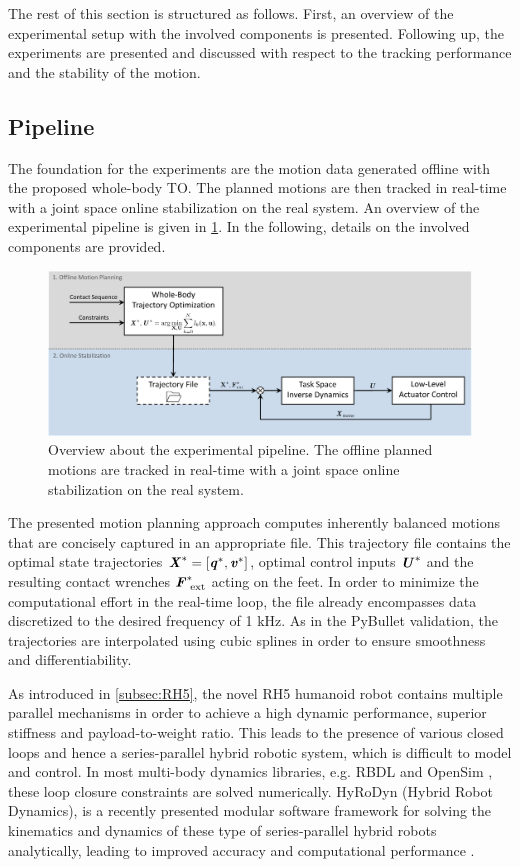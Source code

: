 The rest of this section is structured as follows. First, an overview of the experimental setup with the involved components is presented. Following up, the experiments are presented and discussed with respect to the tracking performance and the stability of the motion.

\subsection{Pipeline}\label{subsec:Pipeline}
The foundation for the experiments are the motion data generated offline with the proposed whole-body \gls{TO}. The planned motions are then tracked in real-time with a joint space online stabilization on the real system. An overview of the experimental pipeline is given in \cref{img:experimentalSetup}. In the following, details on the involved components are provided. 
\begin{figure}
\centering	
\includegraphics[width=1\textwidth]{img/experimentalSetup}
\caption[Overview about the experimental pipeline]{Overview about the experimental pipeline. The offline planned motions are tracked in real-time with a joint space online stabilization on the real system.}
\label{img:experimentalSetup}
\end{figure}
The presented motion planning approach computes inherently balanced motions that are concisely captured in an appropriate file. This trajectory file contains the optimal state trajectories $\bm{\mathit{X}}^*=[\bm{\mathit{q}}^*,\bm{\mathit{v}}^*]$, optimal control inputs $\bm{\mathit{U}}^*$ and the resulting contact wrenches $\bm{\mathit{F}}_{\text{ ext}}^*$ acting on the feet. In order to minimize the computational effort in the real-time loop, the file already encompasses data discretized to the desired frequency of 1 kHz. As in the PyBullet validation, the trajectories are interpolated using cubic splines in order to ensure smoothness and differentiability. 

As introduced in \cref{subsec:RH5}, the novel RH5 humanoid robot contains multiple parallel mechanisms in order to achieve a high dynamic performance, superior stiffness and payload-to-weight ratio. This leads to the presence of various closed loops and hence a series-parallel hybrid robotic system, which is difficult to model and control. In most multi-body dynamics libraries, e.g. RBDL \cite{felis2017rbdl} and OpenSim \cite{delp2007opensim}, these loop closure constraints are solved numerically. HyRoDyn (Hybrid Robot Dynamics), is a recently presented modular software framework for solving the kinematics and dynamics of these type of series-parallel hybrid robots analytically, leading to improved accuracy and computational performance \cite{kumar2020analytical}.

